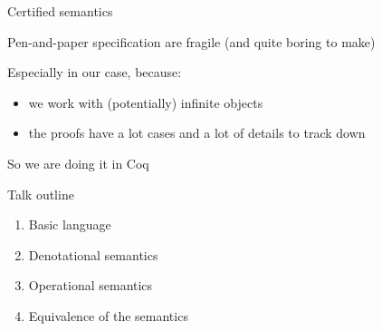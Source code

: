 \documentclass{beamer}
\theoremstyle{definition}
\theoremstyle{plain} %
\begin{document}
\begin{frame}{Certified semantics}

Pen-and-paper specification are fragile (and quite boring to make)

\vskip5mm

Especially in our case, because:
\begin{itemize}
\item we work with (potentially) infinite objects
\item the proofs have a lot cases and a lot of details to track down
\end{itemize}

\vskip8mm

So we are doing it in Coq

\end{frame}



\begin{frame}{Talk outline}

\begin{enumerate}
  \item Basic language 
  \vskip6mm
  \item Denotational semantics 
  \vskip6mm
  \item Operational semantics 
  \vskip6mm
  \item Equivalence of the semantics 
\end{enumerate}

\end{frame}
\end{document}
